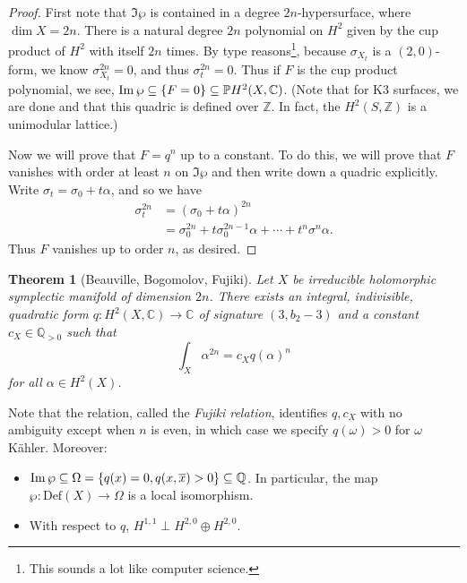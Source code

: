 \documentclass[leqno, openany]{memoir}
\newtheorem{thm}{Theorem}[section]
\theoremstyle{definition}
\theoremstyle{remark}
\theoremstyle{plain}
\theoremstyle{definition}
\theoremstyle{remark}
\newcommand{\C}{\mathbb{C}}
\newcommand{\Z}{\mathbb{Z}}
\newcommand{\Q}{\mathbb{Q}}
\renewcommand{\P}{\mathbb{P}}
\newcommand{\mr}[1]{\mathrm{#1}}
\newcommand{\ol}[1]{\overline{#1}}
\begin{document}
\begin{proof}
    First note that $\Im \wp$ is contained in a degree $2n$-hypersurface, where $\dim X = 2n$. There is a natural degree $2n$ polynomial on $H^2$ given by the cup product of $H^2$ with itself $2n$ times. By type reasons\footnote{This sounds a lot like computer science.}, because $\sigma_{X_t}$ is a $(2,0)$-form, we know $\sigma_{X_t}^{2n} = 0$, and thus $\sigma_t^{2n} = 0$. Thus if $F$ is the cup product polynomial, we see, $\Im \wp \subseteq \qty{F = 0} \subseteq \P H^2(X, \C)$. (Note that for K3 surfaces, we are done and that this quadric is defined over $\Z$. In fact, the $H^2(S, \Z)$ is a unimodular lattice.)

    Now we will prove that $F = q^n$ up to a constant. To do this, we will prove that $F$ vanishes with order at least $n$ on $\Im \wp$ and then write down a quadric explicitly. Write $\sigma_t = \sigma_0 + t \alpha$, and so we have
    \begin{align*}
        \sigma_t^{2n} &= {(\sigma_0 + t \alpha)}^{2n} \\
        &= \sigma_0^{2n} + t \sigma_0^{2n-1} \alpha + \cdots + t^n \sigma^n \alpha.
    \end{align*}
    Thus $F$ vanishes up to order $n$, as desired.
\end{proof}

\begin{thm}[Beauville, Bogomolov, Fujiki]
    Let $X$ be irreducible holomorphic symplectic manifold of dimension $2n$. There exists an integral, indivisible, quadratic form $q \colon H^2(X, \C) \to \C$ of signature $(3, b_2 - 3)$ and a constant $c_X \in \Q_{>0}$ such that 
    \[ \int_X \alpha^{2n} = c_X {q(\alpha)}^n \] 
    for all $\alpha \in H^2(X)$.
\end{thm}
Note that the relation, called the \textit{Fujiki relation}, identifies $q, c_X$ with no ambiguity except when $n$ is even, in which case we specify $q(\omega) > 0$ for $\omega$ K\"ahler. Moreover:
\begin{itemize}
    \item $\Im \wp \subseteq \Omega = \qty{ q(x) = 0, q(x,\ol{x}) > 0} \subseteq \Q$. In particular, the map $\wp \colon \mr{Def}(X) \to \Omega$ is a local isomorphism.
    \item With respect to $q$, $H^{1,1} \perp H^{2,0} \oplus H^{2,0}$.
\end{itemize}
\end{document}
